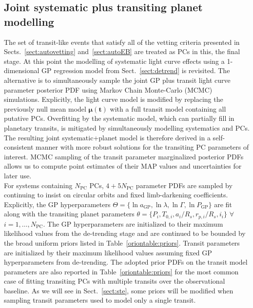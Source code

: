 \subsection{Joint systematic plus transiting planet modelling} \label{sect:joint}
The set of transit-like events that satisfy all of the  vetting criteria
presented in Sects.~\ref{sect:autovetting} and~\ref{sect:autoEB} are treated
as PCs in this, the final \pipeline{} stage. At this point the modelling of systematic
light curve effects using a 1-dimensional GP regression model from Sect.~\ref{sect:detrend}
is revisited. The alternative is to simultaneously sample the joint GP plus transit light curve
parameter posterior PDF using Markov Chain Monte-Carlo (MCMC) simulations.
Explicitly, the light curve model is modified by replacing the previously null mean model
$\boldsymbol{\mu}(\mathbf{t})$ with a full transit model containing all putative PCs. 
Overfitting by the systematic model, which can partially fill in planetary
transits, is mitigated by simultaneously modelling systematics and PCs.
The resulting joint systematic+planet model is therefore derived in a self-consistent
manner with more robust solutions for the transiting PC parameters of interest.
MCMC sampling of the transit parameter marginalized posterior PDFs allows us to compute
point estimates of their MAP values and uncertainties for later use. \\

For systems containing $N_{\text{PC}}$ PCs, $4+5N_{\text{PC}}$ parameter PDFs are sampled
by continuing to insist on circular orbits and fixed limb-darkening coefficients.
Explicitly, the GP
hyperparameters $\Theta = \{\ln{a_{\text{GP}}},\ln{\lambda},\ln{\Gamma},\ln{P_{\text{GP}}}\}$
are fit along with the
transiting planet parameters $\theta = \{P_i,T_{0,i},a_i/R_s,r_{p,i}/R_s,i_i \}$
$\forall$ $i=1,\dots,N_{\text{PC}}$. The GP hyperparameters are initialized to their maximum
likelihood values from the de-trending stage and are continued to be bounded by the broad
uniform priors listed in Table~\ref{oriontable:priors}. Transit parameters are
initialized by their maximum likelihood values assuming fixed GP hyperparameters from
de-trending. The adopted prior PDFs on the transit model parameters are also reported
in Table~\ref{oriontable:priors} for the most common case of fitting transiting PCs with
multiple transits over the observational baseline.
As we will see in Sect.~\ref{sect:ste}, some priors will be modified when sampling transit
parameters used to model only a single transit.  \\

